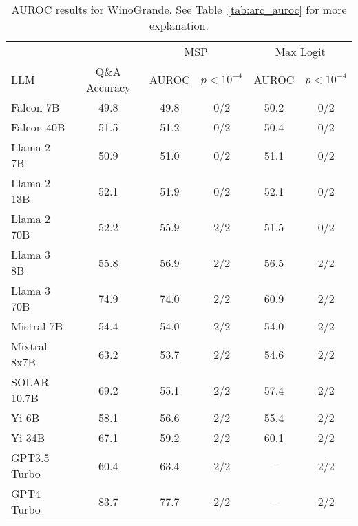 \begin{table*}
\centering
\caption{AUROC results for WinoGrande. See Table~\ref{tab:arc_auroc} for more explanation.}
\label{tab:winogrande_auroc}
\begin{tabular}{lccccc}
\toprule
& & \multicolumn{2}{c}{MSP} & \multicolumn{2}{c}{Max Logit} \\ 
LLM & Q\&A Accuracy & AUROC & $p < 10^{-4}$ & AUROC & $p < 10^{-4}$\\ 
\cmidrule(lr){1-1} \cmidrule(lr){2-2} \cmidrule(lr){3-4} \cmidrule(lr){5-6}
Falcon 7B & 49.8 & 49.8 & 0/2 & 50.2 & 0/2\\
Falcon 40B & 51.5 & 51.2 & 0/2 & 50.4 & 0/2\\
Llama 2 7B & 50.9 & 51.0 & 0/2 & 51.1 & 0/2\\
Llama 2 13B & 52.1 & 51.9 & 0/2 & 52.1 & 0/2\\
Llama 2 70B & 52.2 & 55.9 & 2/2 & 51.5 & 0/2\\
Llama 3 8B & 55.8 & 56.9 & 2/2 & 56.5 & 2/2\\
Llama 3 70B & 74.9 & 74.0 & 2/2 & 60.9 & 2/2\\
Mistral 7B & 54.4 & 54.0 & 2/2 & 54.0 & 2/2\\
Mixtral 8x7B & 63.2 & 53.7 & 2/2 & 54.6 & 2/2\\
SOLAR 10.7B & 69.2 & 55.1 & 2/2 & 57.4 & 2/2\\
Yi 6B & 58.1 & 56.6 & 2/2 & 55.4 & 2/2\\
Yi 34B & 67.1 & 59.2 & 2/2 & 60.1 & 2/2\\
GPT3.5 Turbo & 60.4 & 63.4 & 2/2 & -- & 2/2\\
GPT4 Turbo & 83.7 & 77.7 & 2/2 & -- & 2/2\\
\bottomrule
\end{tabular}
\end{table*}
